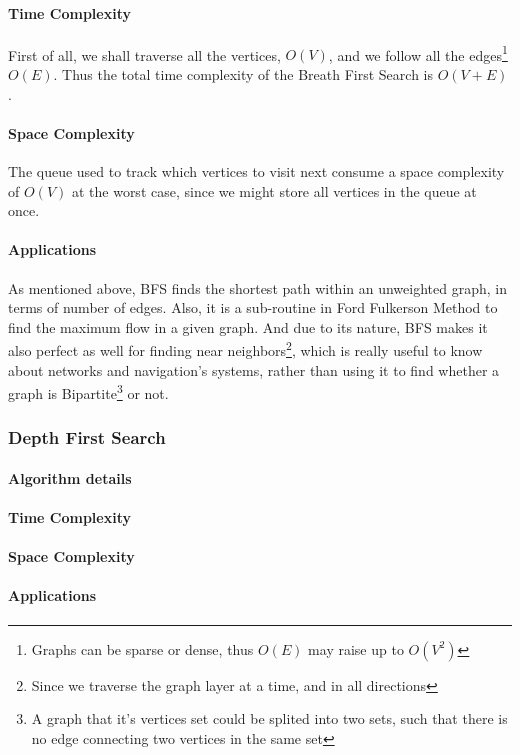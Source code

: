 \documentclass[12pt]{article}
\begin{document}
\paragraph{Time Complexity} First of all, we shall traverse all the vertices, $O(V)$, and we follow all the edges\footnote{Graphs can be sparse or dense, thus $O(E)$ may raise up to $O(V^2)$} $O(E)$. Thus the total time complexity of the Breath First Search is $O(V+E)$.

\paragraph{Space Complexity} The queue used to track which vertices to visit next consume a space complexity of $O(V)$ at the worst case, since we might store all vertices in the queue at once.

\paragraph{Applications} As mentioned above, BFS finds the shortest path within  an unweighted graph, in terms of number of edges. Also, it is a sub-routine in Ford Fulkerson Method to find the maximum flow in a given graph. And due to its nature, BFS makes it also perfect as well for finding near neighbors\footnote{Since we traverse the graph layer at a time, and in all directions}, which is really useful to know about networks and navigation's systems, rather than using it to find whether a graph is Bipartite\footnote{A graph that it's vertices set could be splited into two sets, such that there is no edge connecting two vertices in the same set} or not.

\subsubsection{Depth First Search}
\paragraph{Algorithm details}
\paragraph{Time Complexity}
\paragraph{Space Complexity}
\paragraph{Applications}
\end{document}
